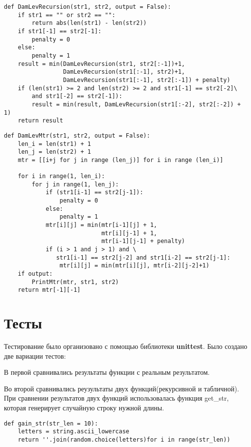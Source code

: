 \documentclass[12pt]{report}
\begin{document}
\begin{lstlisting}[label=some-code,caption=Функция нахождения расстояния Дамерау-Левенштейна рекурсивно]
def DamLevRecursion(str1, str2, output = False):
    if str1 == "" or str2 == "":
        return abs(len(str1) - len(str2))
    if str1[-1] == str2[-1]:
        penalty = 0
    else:
        penalty = 1
    result = min(DamLevRecursion(str1, str2[:-1])+1,
                 DamLevRecursion(str1[:-1], str2)+1,
                 DamLevRecursion(str1[:-1], str2[:-1]) + penalty)
    if (len(str1) >= 2 and len(str2) >= 2 and str1[-1] == str2[-2]\
        and str1[-2] == str2[-1]):
        result = min(result, DamLevRecursion(str1[:-2], str2[:-2]) + 1)
    return result
\end{lstlisting}

\begin{lstlisting}[label=some-code,caption=Функция нахождения расстояния Дамерау-Левенштейна матрично]
def DamLevMtr(str1, str2, output = False):
    len_i = len(str1) + 1
    len_j = len(str2) + 1
    mtr = [[i+j for j in range (len_j)] for i in range (len_i)]

    for i in range(1, len_i):
        for j in range(1, len_j):
            if (str1[i-1] == str2[j-1]):
                penalty = 0
            else:
                penalty = 1
            mtr[i][j] = min(mtr[i-1][j] + 1,
                            mtr[i][j-1] + 1,
                            mtr[i-1][j-1] + penalty)
            if (i > 1 and j > 1) and \
               str1[i-1] == str2[j-2] and str1[i-2] == str2[j-1]:
                mtr[i][j] = min(mtr[i][j], mtr[i-2][j-2]+1)
    if output:
        PrintMtr(mtr, str1, str2)
    return mtr[-1][-1]
\end{lstlisting}

\section{Тесты}
Тестирование было организовано с помощью библиотеки  \textbf{unittest}.
Было создано две вариации тестов:

В первой сравнивались результаты функции с реальным результатом.

Во второй сравнивались реузультаты двух функций(рекурсивной и табличной).
При сравнении результатов двух функций использовалась функция get_str, которая генерирует случайную строку нужной длины.

\begin{lstlisting}[label=randStr,caption=Функция генерации случайной строки]
def gain_str(str_len = 10):
    letters = string.ascii_lowercase
    return ''.join(random.choice(letters)for i in range(str_len))
\end{lstlisting}
\end{document}
